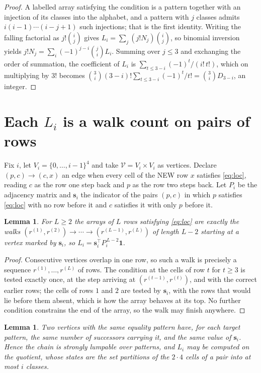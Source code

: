 \documentclass[11pt,a4paper]{article}
\theoremstyle{plain}
\newtheorem{lemma}[theorem]{Lemma}
\theoremstyle{definition}
\begin{document}
\begin{proof}
A labelled array satisfying the condition is a pattern together with an injection of its
classes into the alphabet, and a pattern with $j$ classes admits $i(i-1)\cdots(i-j+1)$ such
injections; that is the first identity. Writing the falling factorial as $j!\binom{i}{j}$
gives $L_i=\sum_j(j!N_j)\binom{i}{j}$, so binomial inversion yields
$j!N_j=\sum_i(-1)^{j-i}\binom{j}{i}L_i$. Summing over $j\le3$ and exchanging the
order of summation, the coefficient of $L_i$ is $\sum_{t\le3-i}(-1)^t/(i!\,t!)$, which on
multiplying by $3!$ becomes
$\binom{3}{i}(3-i)!\sum_{t\le3-i}(-1)^t/t!=\binom{3}{i}D_{3-i}$, an
integer.
\end{proof}

\section{Each $L_i$ is a walk count on pairs of rows}

Fix $i$, let $V_i=\{0,\dots,i-1\}^{4}$ and take $\mathcal V=V_i\times V_i$ as vertices.
Declare $(p,c)\to(c,x)$ an edge when every cell of the NEW row $x$ satisfies
\eqref{eq:loc}, reading $c$ as the row one step back and $p$ as the row two steps
back. Let $P_i$ be the adjacency matrix and $\mathbf{s}_i$ the indicator of the pairs
$(p,c)$ in which $p$ satisfies \eqref{eq:loc} with no row before it and $c$ satisfies it
with only $p$ before it.

\begin{lemma}\label{lem:walk}
For $L\ge2$ the arrays of $L$ rows satisfying \eqref{eq:loc} are exactly the walks
$(r^{(1)},r^{(2)})\to\cdots\to(r^{(L-1)},r^{(L)})$ of length $L-2$ starting at a
vertex marked by $\mathbf{s}_i$, so
$L_i=\mathbf{s}_i^{\!\top}P_i^{\,L-2}\mathbf{1}$.
\end{lemma}

\begin{proof}
Consecutive vertices overlap in one row, so such a walk is precisely a sequence
$r^{(1)},\dots,r^{(L)}$ of rows. The condition at the cells of row $t$ for $t\ge3$
is tested exactly once, at the step arriving at $(r^{(t-1)},r^{(t)})$, and with the
correct earlier rows; the cells of rows $1$ and $2$ are tested by $\mathbf{s}_i$, with
the rows that would lie before them absent, which is how the array behaves at its top. No
further condition constrains the end of the array, so the walk may finish anywhere.
\end{proof}

\begin{lemma}\label{lem:lump}
Two vertices with the same equality pattern have, for each target pattern, the same number of
successors carrying it, and the same value of $\mathbf{s}_i$. Hence the chain is strongly
lumpable over patterns, and $L_i$ may be computed on the quotient, whose states are the set
partitions of the $2\cdot4$ cells of a pair into at most $i$ classes.
\end{lemma}
\end{document}
